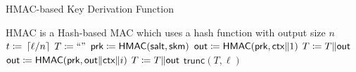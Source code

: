 \begin{algorithm}[t]
\caption{HMAC-based Key Derivation Function}
\label{alg:hkdf}
\begin{algorithmic}[1]
\Require \textsf{HMAC} is a Hash-based MAC
    which uses a hash function with output size $n$
    \State $t \coloneqq{} \left\lceil \ell/n \right\rceil$
    \State $T \coloneqq{} \text{``''}$
    \State $\textsf{prk} \coloneqq{}
        \textsf{HMAC}(\textsf{salt}, \textsf{skm})$
    \State $\textsf{out} \coloneqq{} 
        \textsf{HMAC}(\textsf{prk}, \textsf{ctx}\|1)$
    \State $T \coloneqq{} T\|\textsf{out}$
        \State $\textsf{out} \coloneqq{} 
            \textsf{HMAC}(\textsf{prk}, \textsf{out}\|\textsf{ctx}\|i)$
        \State $T \coloneqq{} T\|\textsf{out}$
    \EndFor
    \State \Return $\textsf{trunc}(T, \ell)$
\EndProcedure
\end{algorithmic}
\end{algorithm}
